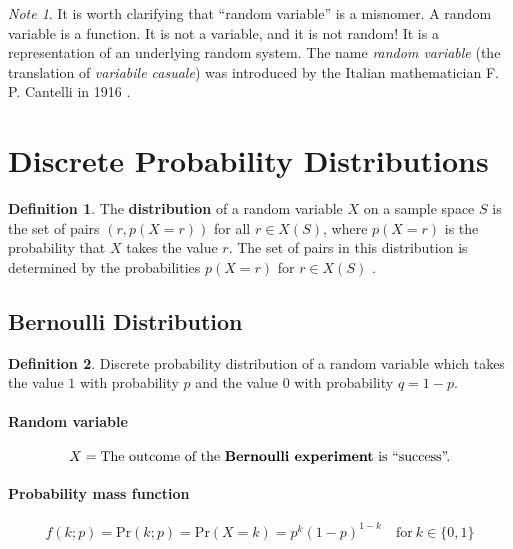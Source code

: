\documentclass[12pt]{article}
\theoremstyle{plain}
\theoremstyle{definition}
\newtheorem{definition}{Definition}
\theoremstyle{remark}
\newtheorem*{note}{Note}
\begin{document}
\begin{note}
  It is worth clarifying that ``random variable'' is a misnomer.
  A random variable is a function.
  It is not a variable, and it is not random!
  It is a representation of an underlying random system.
  The name \textit{random variable} (the translation of
  \textit{variabile casuale}) was introduced by the Italian mathematician
  F. P. Cantelli in 1916 \citep{ros02}.
\end{note}

\section{Discrete Probability Distributions}

\begin{definition}
  The \textbf{distribution} of a random variable $X$ on a sample space $S$
  is the set of pairs $(r,p(X=r))$ for all $r \in X(S)$, where $p(X=r)$ is the
  probability that $X$ takes the value $r$.
  The set of pairs in this distribution is determined by the probabilities
  $p(X=r)$ for $r \in X(S)$ \citep{ros02}.
\end{definition}

\subsection{Bernoulli Distribution}

\begin{definition}
  Discrete probability distribution of a random variable which takes the value
  $1$ with probability $p$ and the value $0$ with probability $q=1-p$.
\end{definition}

\paragraph{Random variable}
\begin{equation*}
  X = \text{The outcome of the \textbf{Bernoulli experiment} is ``success''.}
\end{equation*}

\paragraph{Probability mass function}
\begin{equation*}\label{bernoulli}
  f(k;p) = \mathrm{Pr}(k;p) = \mathrm{Pr}(X=k) = p^k(1 - p)^{1-k}
  \quad \text{for}\ k \in \{0,1\}
\end{equation*}
\end{document}

